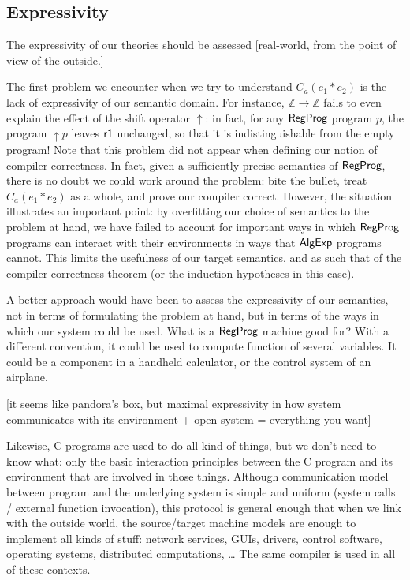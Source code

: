 {\color{gray} %

\subsection{Expressivity} %

The expressivity of our theories
should be assessed
[real-world,
from the point of view of the outside.]

The first problem we encounter when we try to understand $C_a(e_1 * e_2)$
is the lack of expressivity of our semantic domain.
For instance,
$\mathbb{Z} \rightarrow \mathbb{Z}$
fails to even explain the effect of the shift operator $\uparrow$:
in fact, for any $ \textsf{RegProg} $ program $p$,
the program ${\uparrow}p$ leaves $ \textsf{r1} $ unchanged,
so that it is indistinguishable from the empty program!
Note that this problem did not appear
when defining our notion of compiler correctness.
In fact,
given a sufficiently precise semantics of $ \textsf{RegProg} $,
there is no doubt we could work around the problem:
bite the bullet, treat $C_a(e_1 * e_2)$ as a whole,
and prove our compiler correct.
However,
the situation illustrates an important point:
by overfitting our choice of semantics to the problem at hand,
we have failed to account for important ways in which
$ \textsf{RegProg} $ programs can interact with their environments
in ways that $ \textsf{AlgExp} $ programs cannot.
This limits the usefulness of our target semantics,
and as such that of the compiler correctness theorem
(or the induction hypotheses in this case).

A better approach would have been to
assess the expressivity of our semantics,
not in terms of formulating the problem at hand,
but in terms of the ways in which our system
could be used.
What is a $ \textsf{RegProg} $ machine good for?
With a different convention,
it could be used to compute function of several variables.
It could be a component in a handheld calculator,
or the control system of an airplane.

[it seems like pandora's box,
but maximal expressivity in how system communicates with its environment
+ open system = everything you want]

Likewise, C programs are used to do all kind of things,
but we don't need to know what:
only the basic interaction principles
between the C program and its environment that are involved
in those things.
Although communication model between program
and the underlying system is simple and uniform
(system calls / external function invocation),
this protocol is general enough that
when we link with the outside world,
the source/target machine models are enough to
implement all kinds of stuff:
network services, GUIs, drivers, control software,
operating systems, distributed computations, \ldots
The same compiler is used in all of these contexts.


} %

